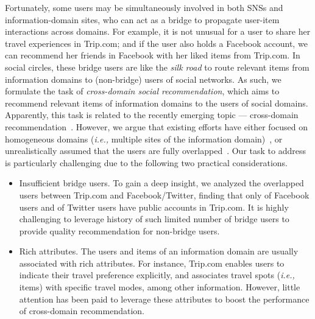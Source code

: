 \documentclass[sigconf]{acmart}
\begin{document}
Fortunately, some users may be simultaneously involved in both SNSs and information-domain sites, who can act as a bridge to propagate user-item interactions across domains.
For example, it is not unusual for a user to share her travel experiences in Trip.com; and if the user also holds a Facebook account, we can recommend her friends in Facebook with her liked items from Trip.com.
In social circles, these bridge users are like the \emph{silk road} to route relevant items from information domains to  (non-bridge) users of social networks.
As such, we formulate the task of \textit{cross-domain social recommendation}, which aims to recommend relevant items of information domains to the users of social domains.
Apparently, this task is related to the recently emerging topic --- cross-domain recommendation~\cite{DBLP:journals/tkde/JiangCCW0Y15}.
However, we argue that existing efforts have either focused on homogeneous domains (\textit{i.e.,} multiple sites of the information domain)~\cite{DBLP:conf/www/ElkahkySH15}, or unrealistically assumed that the users are fully overlapped~\cite{DBLP:journals/tkde/JiangCCW0Y15,wang2017unifying}. Our task to address is particularly challenging due to the following two practical considerations.


\begin{itemize}[leftmargin=*]
\item Insufficient bridge users. To gain a deep insight, we analyzed the overlapped users between Trip.com and Facebook/Twitter, finding that only  of  Facebook users and  of  Twitter users have public accounts in Trip.com. It is highly challenging to leverage history of such limited number of bridge users to provide quality recommendation for non-bridge users.\item Rich attributes. The users and items of an information domain are usually associated with rich attributes. For instance, Trip.com enables users to indicate their travel preference explicitly, and associates travel spots (\textit{i.e.,} items) with specific travel modes, among other information. However, little attention has been paid to leverage these attributes to boost the performance of cross-domain recommendation.
\end{itemize} \vspace{-5pt}
\end{document}
